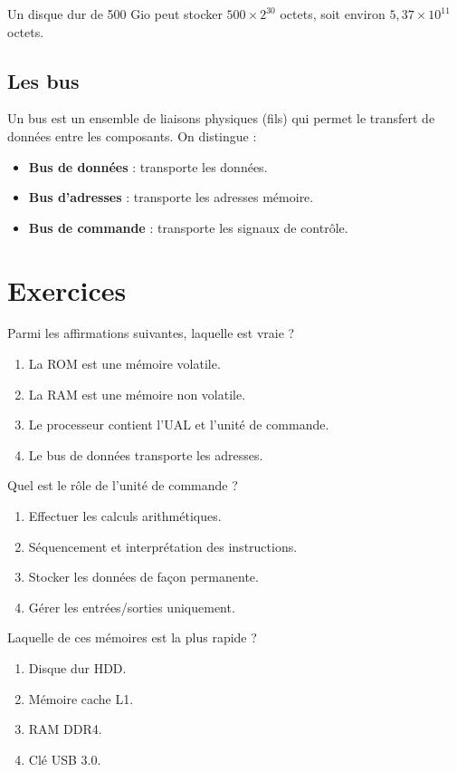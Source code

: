 \begin{exemple}
Un disque dur de 500 Gio peut stocker $500 \times 2^{30}$ octets, soit environ $5,37 \times 10^{11}$ octets.
\end{exemple}

\subsection{Les bus}
Un bus est un ensemble de liaisons physiques (fils) qui permet le transfert de données entre les composants. On distingue :
\begin{itemize}
    \item \textbf{Bus de données} : transporte les données.
    \item \textbf{Bus d’adresses} : transporte les adresses mémoire.
    \item \textbf{Bus de commande} : transporte les signaux de contrôle.
\end{itemize}

\section{Exercices}


\exo{}
Parmi les affirmations suivantes, laquelle est vraie ?
\begin{enumerate}
    \item La ROM est une mémoire volatile.
    \item La RAM est une mémoire non volatile.
    \item Le processeur contient l’UAL et l’unité de commande.
    \item Le bus de données transporte les adresses.
\end{enumerate}

\exo{}
Quel est le rôle de l’unité de commande ?
\begin{enumerate}
    \item Effectuer les calculs arithmétiques.
    \item Séquencement et interprétation des instructions.
    \item Stocker les données de façon permanente.
    \item Gérer les entrées/sorties uniquement.
\end{enumerate}

\exo{}
Laquelle de ces mémoires est la plus rapide ?
\begin{enumerate}
    \item Disque dur HDD.
    \item Mémoire cache L1.
    \item RAM DDR4.
    \item Clé USB 3.0.
\end{enumerate}

